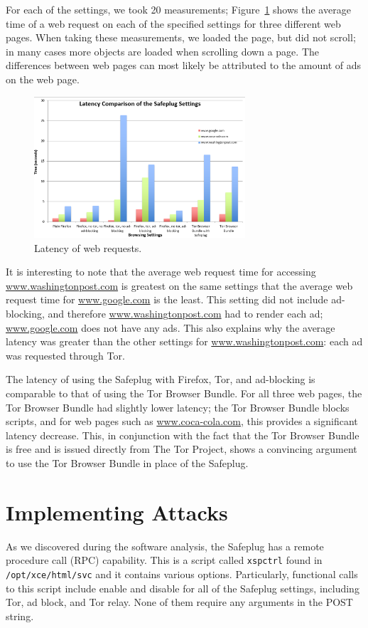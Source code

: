 \documentclass[conference]{IEEEtran}
\begin{document}
For each of the settings, we took 20 measurements; Figure~\ref{fig:latency2} shows the average time of a web request on each of the specified settings for three different web pages.  When taking these measurements, we loaded the page, but did not scroll; in many cases more objects are loaded when scrolling down a page.  The differences between web pages can most likely be attributed to the amount of ads on the web page.  

\begin{figure}
  \centering
  \includegraphics[width=0.7\textwidth]{latency2}
  \caption{Latency of web requests.}
  \label{fig:latency2}
\end{figure}

It is interesting to note that the average web request time for accessing \url{www.washingtonpost.com} is greatest on the same settings that the average web request time for \url{www.google.com} is the least. This setting did not include ad-blocking, and therefore \url{www.washingtonpost.com} had to render each ad; \url{www.google.com} does not have any ads.  This also explains why the average latency was greater than the other settings for \url{www.washingtonpost.com}: each ad was requested through Tor.   

The latency of using the Safeplug with Firefox, Tor, and ad-blocking is comparable to that of using the Tor Browser Bundle.  For all three web pages, the Tor Browser Bundle had slightly lower latency; the Tor Browser Bundle blocks scripts, and for web pages such as \url{www.coca-cola.com}, this provides a significant latency decrease.  This, in conjunction with the fact that the Tor Browser Bundle is free and is issued directly from The Tor Project, shows a convincing argument to use the Tor Browser Bundle in place of the Safeplug.  

\section{Implementing Attacks}
As we discovered during the software analysis, the Safeplug has a remote procedure call (RPC) capability.  This is a script called \verb!xspctrl! found in \verb!/opt/xce/html/svc! and it contains various options.  Particularly, functional calls to this script include enable and disable for all of the Safeplug settings, including Tor, ad block, and Tor relay.  None of them require any arguments in the POST string.
\end{document}
